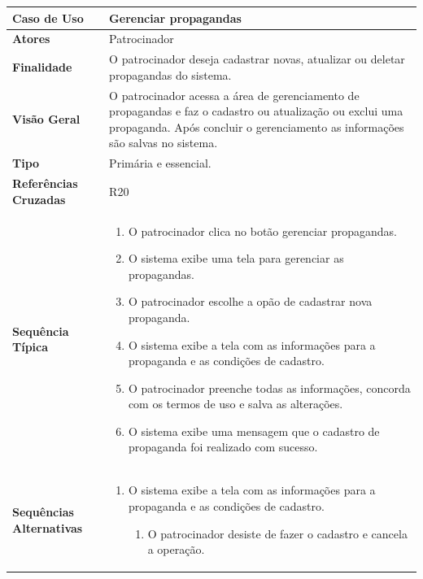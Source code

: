\documentclass[a4paper,11pt]{article}
\begin{document}
\begin{table}[H]
		\begin{tabularx}{\textwidth}{|l|X|}
		\hline
			\textbf{Caso de Uso} &  Gerenciar propagandas \\ \hline
			\textbf{Atores} & Patrocinador   \\ \hline
			\textbf{Finalidade} &  O patrocinador deseja cadastrar novas, atualizar ou deletar propagandas do sistema. \\ \hline
			\textbf{Visão Geral} &  O patrocinador acessa a área de gerenciamento de propagandas e faz o cadastro ou atualização ou exclui uma propaganda. Após concluir o gerenciamento as informações são salvas no sistema. \\ \hline
			\textbf{Tipo} & Primária e essencial. \\ \hline
			\textbf{Referências Cruzadas} &  R20 \\ \hline
			\textbf{Sequência Típica} & 
			\begin{enumerate}
			\item O patrocinador clica no botão gerenciar propagandas.
			\item O sistema exibe uma tela para gerenciar as propagandas.
			\item O patrocinador escolhe a opão de cadastrar nova propaganda.
			\item O sistema exibe a tela com as informações para a propaganda e as condições de cadastro.	
			\item O patrocinador preenche todas as informações, concorda com os termos de uso e salva as alterações.
			\item O sistema exibe uma mensagem que o cadastro de propaganda foi realizado com sucesso.
			\end{enumerate} \\ \hline
			\textbf{Sequências Alternativas} & 
			\begin{enumerate}
			\item O sistema exibe a tela com as informações para a propaganda e as condições de cadastro.
			\begin{enumerate}
			\item O patrocinador desiste de fazer o cadastro e cancela a operação.
			\end{enumerate}
			\end{enumerate} \\ \hline
		\end{tabularx}
\end{table}
\end{document}
